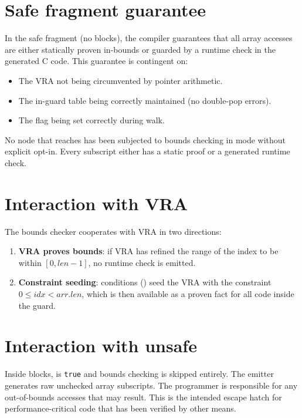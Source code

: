 \section{Safe fragment guarantee}
\label{sec:bounds-safe}

\pnum
In the safe fragment (no  blocks), the compiler guarantees that
all array accesses are either statically proven in-bounds or guarded by a
runtime check in the generated C code.  This guarantee is contingent on:

\begin{itemize}
\item The VRA not being circumvented by pointer arithmetic.
\item The in-guard table being correctly maintained (no double-pop errors).
\item The  flag being set correctly during walk.
\end{itemize}

\begin{invariant}
No  node that reaches  has been
subjected to bounds checking in  mode without explicit opt-in.
Every subscript either has a static proof or a generated runtime check.
\end{invariant}

\section{Interaction with VRA}
\label{sec:bounds-vra}

\pnum
The bounds checker cooperates with VRA in two directions:
\begin{enumerate}
\item \textbf{VRA proves bounds}: if VRA has refined the range of the index
  to be within $[0, len-1]$, no runtime check is emitted.
\item \textbf{Constraint seeding}:  conditions ()
  seed the VRA with the constraint $0 \leq idx < arr.len$, which is then
  available as a proven fact for all code inside the guard.
\end{enumerate}

\section{Interaction with unsafe}
\label{sec:bounds-unsafe}

\pnum
Inside  blocks,  is
\texttt{true} and bounds checking is skipped entirely.  The emitter generates
raw unchecked array subscripts.  The programmer is responsible for any
out-of-bounds accesses that may result.  This is the intended escape hatch for
performance-critical code that has been verified by other means.
